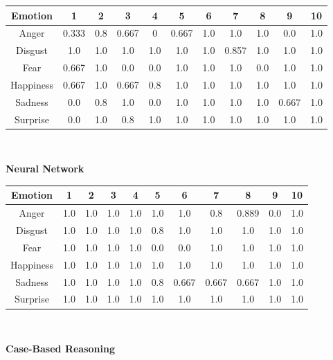 \documentclass[a4paper]{article}
\begin{document}
\begin{center}
  \begin{tabular}{|c|cccccccccc|}
  \hline
    Emotion & 1 & 2 & 3 & 4 & 5 & 6 & 7 & 8 & 9 & 10 \\
    \hline
    Anger 	& 0.333 & 0.8 & 0.667 & 0 & 0.667 & 1.0 & 1.0 & 1.0 & 0.0 & 1.0 \\
	Disgust & 1.0 & 1.0 & 1.0 & 1.0 & 1.0 & 1.0 & 0.857 & 1.0 & 1.0 & 1.0 \\
	Fear 	& 0.667 & 1.0 & 0.0 & 0.0 & 1.0 & 1.0 & 1.0 & 0.0 & 1.0 & 1.0 \\
	Happiness 	& 0.667 & 1.0 & 0.667 & 0.8 & 1.0 & 1.0 & 1.0 & 1.0 & 1.0 & 1.0 \\
	Sadness 	& 0.0 & 0.8 & 1.0 & 0.0 & 1.0 & 1.0 & 1.0 & 1.0 & 0.667 & 1.0 \\
	Surprise 	& 0.0 & 1.0 & 0.8 & 1.0 & 1.0 & 1.0 & 1.0 & 1.0 & 1.0 & 1.0 \\
	\hline
  \end{tabular}\\
  \end{center}
  
 {\bf Neural Network}\\

\begin{center}
  \begin{tabular}{|c|cccccccccc|}
  \hline
    Emotion & 1 & 2 & 3 & 4 & 5 & 6 & 7 & 8 & 9 & 10 \\
    \hline
    Anger 	& 1.0 & 1.0 & 1.0 & 1.0 & 1.0 & 1.0 & 0.8 & 0.889 & 0.0 & 1.0 \\
	Disgust & 1.0 & 1.0 & 1.0 & 1.0 & 0.8 & 1.0 & 1.0 & 1.0 & 1.0 & 1.0 \\
	Fear 	& 1.0 & 1.0 & 1.0 & 1.0 & 0.0 & 0.0 & 1.0 & 1.0 & 1.0 & 1.0 \\
	Happiness 	& 1.0 & 1.0 & 1.0 & 1.0 & 1.0 & 1.0 & 1.0 & 1.0 & 1.0 & 1.0 \\
	Sadness 	& 1.0 & 1.0 & 1.0 & 1.0 & 0.8 & 0.667 & 0.667 & 0.667 & 1.0 & 1.0 \\
	Surprise 	& 1.0 & 1.0 & 1.0 & 1.0 & 1.0 & 1.0 & 1.0 & 1.0 & 1.0 & 1.0 \\
	\hline
  \end{tabular}\\
  \end{center}
  
  {\bf Case-Based Reasoning}\\
\end{document}
